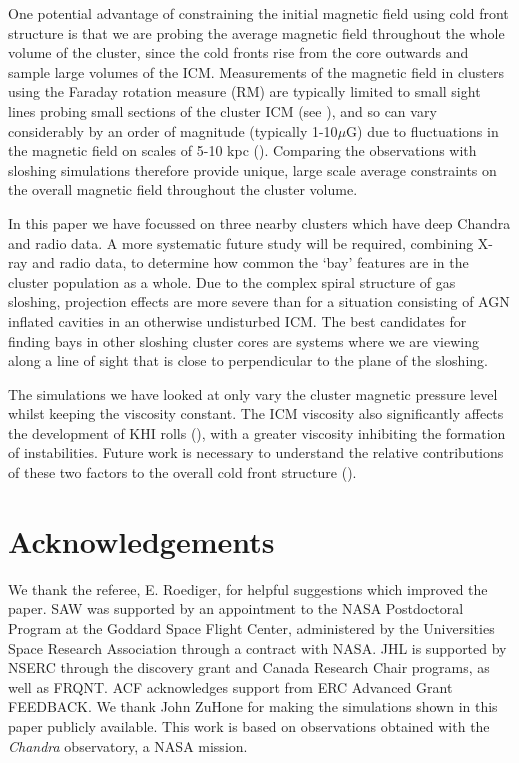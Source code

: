 \documentclass[useAMS,usenatbib]{mn2e}
\begin{document}
One potential advantage of constraining the initial magnetic field using cold front structure is that we are probing the average magnetic field throughout the whole volume of the cluster, since the cold fronts rise from the 
core outwards and sample large volumes of the ICM. Measurements of the magnetic field in clusters using the Faraday rotation measure (RM) are typically limited to small sight lines  
probing small sections of the cluster ICM (see \citealt{Taylor2006}), and so can vary considerably by an order of magnitude (typically 1-10$\mu$G) due to fluctuations in the magnetic field on scales of 5-10 kpc 
(\citealt{Carilli2002review}). Comparing the observations with sloshing simulations therefore provide unique, large scale average constraints on the overall magnetic field throughout the cluster volume.

In this paper we have focussed on three nearby clusters which have deep Chandra and radio data. A more systematic 
future study will be required, combining X-ray and radio data, to 
determine how common the `bay' features are in the cluster population as a whole. Due to the complex spiral structure of gas sloshing, projection effects are more severe than for a situation consisting of 
AGN inflated cavities in 
an otherwise undisturbed ICM. The best candidates for finding bays in other sloshing cluster cores are systems where we are viewing along a line of sight that is close to perpendicular to the plane of the sloshing.

The simulations we have looked at only vary the cluster magnetic pressure level whilst keeping the viscosity constant. 
The ICM viscosity also significantly affects the development of KHI rolls (\citealt{Roediger2013}), with a greater viscosity inhibiting the formation
of instabilities. Future work is necessary to understand the relative contributions of these two factors to the overall cold front structure (\citealt{Zuhone2016review}).







\section*{Acknowledgements}
We thank the referee, E. Roediger, for helpful suggestions which improved the paper.
SAW was supported by an appointment to the NASA Postdoctoral Program at the
Goddard Space Flight Center, administered by the Universities Space Research
Association through a contract with NASA.
JHL is supported by NSERC through the discovery grant and Canada Research Chair programs, as well as FRQNT. 
ACF acknowledges support from ERC
Advanced
Grant FEEDBACK. We thank John ZuHone for making the simulations shown in this paper publicly available. This
work is based on observations obtained with the \emph{Chandra} observatory, a 
NASA mission.
%
%


\end{document}
